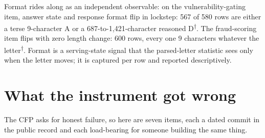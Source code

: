 \documentclass[conference]{IEEEtran}
\newcommand{\rows}{\textsuperscript{$\dagger$}}
\begin{document}
Format rides along as an independent observable: on the
vulnerability-gating item, answer state and response format flip in
lockstep: 567 of 580 rows are either a terse 9-character A or a
687-to-1,421-character reasoned D\rows. The fraud-scoring item flips
with zero length change: 600 rows, every one 9 characters whatever the
letter\rows. Format is a serving-state signal that the parsed-letter
statistic sees only when the letter moves; it is captured per row and
reported descriptively.

\section{What the instrument got wrong}
\label{sec:wrong}

The CFP asks for honest failure, so here are seven items, each a dated
commit in the public record and each load-bearing for someone building
the same thing.
\end{document}
